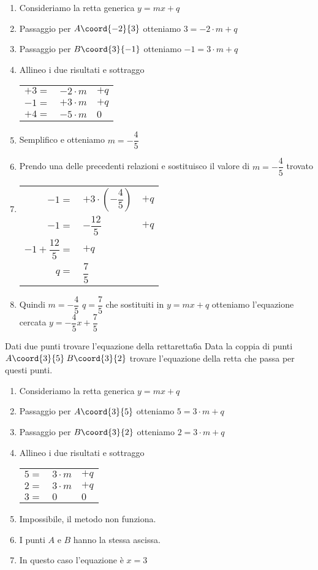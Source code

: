 \begin{enumerate}
	\item Consideriamo la retta generica $y=mx+q$
	\item Passaggio per $A\coord{-2}{3}$ otteniamo $3=-2\cdot m+q$
	\item Passaggio per $B\coord{3}{-1}$ otteniamo $-1=3\cdot m+q$
	\item Allineo i due risultati e sottraggo
	\begin{tabular}{rll}
		$+3=$&$-2\cdot m$ &$+q$  \\ 
		$-1=$&$+3\cdot m$ &$+q$  \\ 
		\hline $+4=$&$-5\cdot m$& $0$ \\ 
	\end{tabular} 
	\item Semplifico e otteniamo $m=-\dfrac{4}{5}$
	\item Prendo una delle precedenti relazioni e sostituisco il valore di $m=-\dfrac{4}{5}$ trovato
	\item \begin{tabular}{rll}
		$-1=$&$+3\cdot(-\dfrac{4}{5}) $ &$+q$  \\ 
		$-1=$&$-\dfrac{12}{5}$ &$+q$  \\ 
		$-1+\dfrac{12}{5}=$& $+q$  \\ 
		$q=$&$\dfrac{7}{5}$ 
	\end{tabular} 
	\item Quindi $m=-\dfrac{4}{5}$ $q=\dfrac{7}{5}$ che sostituiti in $y=mx+q$ otteniamo l'equazione cercata $y=-\dfrac{4}{5}x+\dfrac{7}{5}$
\end{enumerate}
\begin{cesempiot}{Dati due punti trovare l'equazione della retta}{retta6a}
	Data la coppia di punti	$A\coord{3}{5}$\,$B\coord{3}{2}$ trovare l'equazione della retta che passa per questi punti.
\end{cesempiot}
\begin{enumerate}
	\item Consideriamo la retta generica $y=mx+q$
	\item Passaggio per $A\coord{3}{5}$ otteniamo $5=3\cdot m+q$
	\item Passaggio per $B\coord{3}{2}$ otteniamo $2=3\cdot m+q$
	\item Allineo i due risultati e sottraggo
	\begin{tabular}{rll}
		$5=$&$3\cdot m$ &$+q$  \\ 
		$2=$&$3\cdot m$ &$+q$  \\ 
		\midrule $3=$&$0$& $0$ \\ 
	\end{tabular} 
	\item Impossibile, il metodo non funziona.
	\item I punti $A$ e $B$ hanno la stessa ascissa.
	\item In questo caso l'equazione è $x=3$
\end{enumerate}
